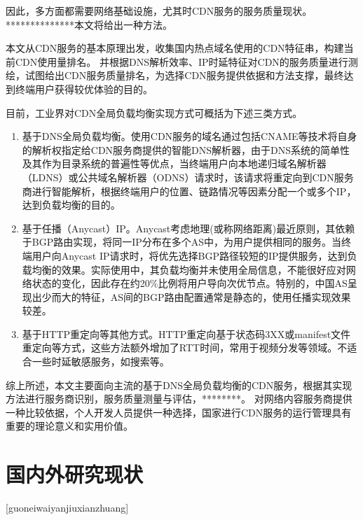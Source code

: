 因此，多方面都需要网络基础设施，尤其时CDN服务的服务质量现状。**************本文将给出一种方法。




本文从CDN服务的基本原理出发，收集国内热点域名使用的CDN特征串，构建当前CDN使用量排名。
并根据DNS解析效率、IP时延特征对CDN的服务质量进行测绘，试图给出CDN服务质量排名，为选择CDN服务提供依据和方法支撑，最终达到终端用户获得较优体验的目的。

目前，工业界对CDN全局负载均衡实现方式可概括为下述三类方式。


\begin{enumerate}[label={(\arabic*)}]


	\item 基于DNS全局负载均衡。使用CDN服务的域名通过包括CNAME等技术\cite{Choffnes2017}将自身的解析权指定给CDN服务商提供的智能DNS解析器，由于DNS系统的简单性及其作为目录系统的普遍性\cite{Pathan-survey-2007}等优点，当终端用户向本地递归域名解析器（LDNS）或公共域名解析器（ODNS）请求时，该请求将重定向到CDN服务商进行智能解析，根据终端用户的位置、链路情况等因素分配一个或多个IP，达到负载均衡的目的。
	\item 基于任播（Anycast）IP。Anycast考虑地理(或称网络距离)最近原则，其依赖于BGP路由实现，将同一IP分布在多个AS中，为用户提供相同的服务。当终端用户向Anycast IP请求时，将优先选择BGP路径较短的IP提供服务，达到负载均衡的效果。实际使用中，其负载均衡并未使用全局信息\cite{Calder2015}，不能很好应对网络状态的变化\cite{Choffnes2017}，因此存在约20\%比例将用户导向次优节点。特别的，中国AS呈现出少而大的特征，AS间的BGP路由配置通常是静态的\cite{Choffnes2017}，使用任播实现效果较差。
    \item 基于HTTP重定向等其他方式。HTTP重定向基于状态码3XX或manifest文件重定向\cite{Adhikari2014}等方式，这些方法额外增加了RTT时间，常用于视频分发等领域。不适合一些时延敏感服务，如搜索等。


\end{enumerate}

综上所述，本文主要面向主流\cite{Hao2018}的基于DNS全局负载均衡的CDN服务，根据其实现方法进行服务商识别，服务质量测量与评估，********。
对网络内容服务商提供一种比较依据，个人开发人员提供一种选择，国家进行CDN服务的运行管理具有重要的理论意义和实用价值。






\section{国内外研究现状}[guoneiwaiyanjiuxianzhuang]



